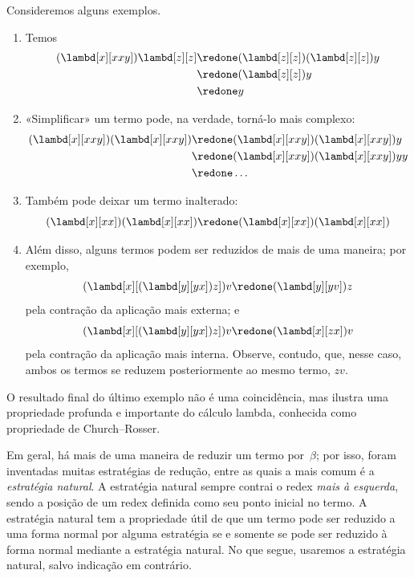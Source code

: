 \documentclass[../../../include/open-logic-section]{subfiles}
\begin{document}
Consideremos alguns exemplos.
\begin{enumerate}
\item Temos
\begin{align*}
(\lambd[x][xxy]) \lambd[z][z] & \redone (\lambd[z][z])(\lambd[z][z]) y \\
& \redone (\lambd[z][z]) y \\
& \redone y
\end{align*}
\item «Simplificar» um termo pode, na verdade, torná-lo mais complexo:
\begin{align*}
(\lambd[x][xxy])(\lambd[x][xxy]) & \redone (\lambd[x][xxy])(\lambd[x][xxy])y \\
& \redone (\lambd[x][xxy])(\lambd[x][xxy])yy \\
& \redone \dots
\end{align*}
\item Também pode deixar um termo inalterado:
\[
(\lambd[x][xx])(\lambd[x][xx]) \redone (\lambd[x][xx])(\lambd[x][xx])
\]
\item Além disso, alguns termos podem ser reduzidos de mais de uma maneira;
  por exemplo,
\[
(\lambd[x][(\lambd[y][yx]) z]) v \redone (\lambd[y][yv]) z
\]
pela contração da aplicação mais externa; e
\[
(\lambd[x][(\lambd[y][yx]) z]) v \redone (\lambd[x][zx]) v
\]
pela contração da aplicação mais interna. Observe, contudo, que, nesse caso,
ambos os termos se reduzem posteriormente ao mesmo termo, $zv$.
\end{enumerate}

O resultado final do último exemplo não é uma coincidência, mas ilustra uma
propriedade profunda e importante do cálculo lambda, conhecida como
propriedade de Church--Rosser.

\begin{digress}
  Em geral, há mais de uma maneira de reduzir um termo por~$\beta$; por isso,
  foram inventadas muitas estratégias de redução, entre as quais a mais comum
  é a \emph{estratégia natural}. A estratégia natural sempre contrai o redex
  \emph{mais à esquerda}, sendo a posição de um redex definida como seu ponto
  inicial no termo. A estratégia natural tem a propriedade útil de que um
  termo pode ser reduzido a uma forma normal por alguma estratégia se e
  somente se pode ser reduzido à forma normal mediante a estratégia natural.
  No que segue, usaremos a estratégia natural, salvo indicação em contrário.
\end{digress}
\end{document}
